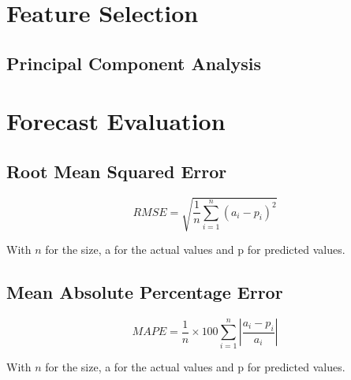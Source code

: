 \section{Feature Selection}
\label{sec:featsel}

\subsection{Principal Component Analysis}

\section{Forecast Evaluation}
\label{sec:fceval}

\subsection{Root Mean Squared Error}

\begin{equation}
RMSE = \sqrt{\frac{1}{n} \sum_{i=1}^{n} (a_i-p_i)^2}
\label{eq:rmse}
\end{equation}

With $n$ for the size, a for the actual values and p for predicted values.\\

\subsection{Mean Absolute Percentage Error}

\begin{equation}
MAPE = \frac{1}{n}\times 100 \sum_{i=1}^{n} \left|\frac{a_i-p_i}{a_i}\right|
\label{eq:mape}
\end{equation}

With $n$ for the size, a for the actual values and p for predicted values.\\





%
%
%

